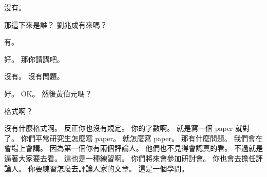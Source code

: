 \hypertarget{w01:cue:1609}{}沒有。

\hypertarget{w01:cue:1610}{}那這下來是誰？
\hypertarget{w01:cue:1611}{}劉兆成有來嗎？

\hypertarget{w01:cue:1612}{}有。

\hypertarget{w01:cue:1613}{}好。
\hypertarget{w01:cue:1614}{}那你請講吧。

\hypertarget{w01:cue:1615}{}沒有。
\hypertarget{w01:cue:1616}{}沒有問題。

\hypertarget{w01:cue:1617}{}好。
\hypertarget{w01:cue:1618}{}OK。
\hypertarget{w01:cue:1619}{}然後黃伯元嗎？

\hypertarget{w01:cue:1620}{}格式啊？

\hypertarget{w01:cue:1621}{}沒有什麼格式啊。
\hypertarget{w01:cue:1622}{}反正你也沒有規定。
\hypertarget{w01:cue:1623}{}你的字數啊。
\hypertarget{w01:cue:1624}{}就是寫一個 paper 就對了。
\hypertarget{w01:cue:1625}{}你們平常研究生怎麼寫 paper。
\hypertarget{w01:cue:1626}{}就怎麼寫 paper。
\hypertarget{w01:cue:1627}{}那有什麼問題。
\hypertarget{w01:cue:1628}{}我們會在會場上會講。
\hypertarget{w01:cue:1629}{}因為第一個你有兩個評論人。
\hypertarget{w01:cue:1630}{}他們也不見得會認真的看。
\hypertarget{w01:cue:1631}{}不過就是逼著大家要去看。
\hypertarget{w01:cue:1632}{}這也是一種練習啊。
\hypertarget{w01:cue:1633}{}你們將來會參加研討會。
\hypertarget{w01:cue:1634}{}你也會去擔任評論人。
\hypertarget{w01:cue:1635}{}你要練習怎麼去評論人家的文章。
\hypertarget{w01:cue:1636}{}這是一個學問。

